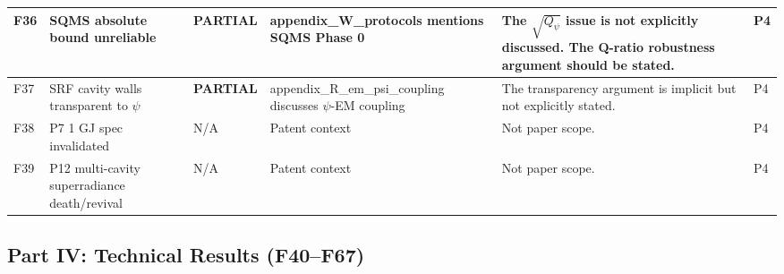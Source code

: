 \documentclass[11pt,a4paper]{article}
\newcommand{\PARTIAL}{\textcolor{partial}{\textbf{PARTIAL}}}
\begin{document}
\begin{longtable}{|p{0.5cm}|p{3.5cm}|p{1.2cm}|p{3.5cm}|p{4.5cm}|p{1cm}|}
F36 & SQMS absolute bound unreliable &
\PARTIAL &
appendix\_W\_protocols mentions SQMS Phase 0 &
The $\sqrt{Q_\psi}$ issue is not explicitly discussed. The Q-ratio robustness argument should be stated. &
P4 \\
\hline

F37 & SRF cavity walls transparent to $\psi$ &
\PARTIAL &
appendix\_R\_em\_psi\_coupling discusses $\psi$-EM coupling &
The transparency argument is implicit but not explicitly stated. &
P4 \\
\hline

F38 & P7 1 GJ spec invalidated &
N/A & Patent context & Not paper scope. & P4 \\
\hline

F39 & P12 multi-cavity superradiance death/revival &
N/A & Patent context & Not paper scope. & P4 \\
\hline

\end{longtable}


\subsection{Part IV: Technical Results (F40--F67)}
\end{document}
